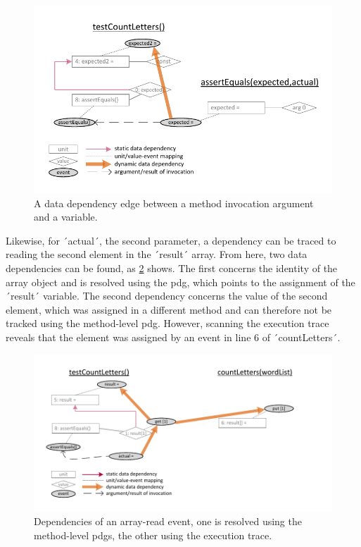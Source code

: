 \begin{figure}[tp]
\centering
\includegraphics[width=.8\linewidth, clip, trim=6mm 6mm 6mm 7mm]{img/graph_dynamic_arg}
\caption{A data dependency edge between a method invocation argument and a variable.}
\label{fig:graph_dynamic_arg}
\end{figure}

Likewise, for ´actual´, the second parameter, a dependency can be traced to reading the second element in the ´result´ array.
From here, two data dependencies can be found, as \cref{fig:graph_dynamic_array} shows.
The first concerns the identity of the array object and is resolved using the \ac{pdg}, which points to the assignment of the ´result´ variable.
The second dependency concerns the value of the second element, which was assigned in a different method and can therefore not be tracked using the method-level \ac{pdg}.
However, scanning the execution trace reveals that the element was assigned by an event in line 6 of ´countLetters´.

\begin{figure}[tp]
\centering
\includegraphics[width=.8\linewidth, clip, trim=6mm 7mm 19mm 7mm]{img/graph_dynamic_array}
\caption[Dependencies of an array-read event]{Dependencies of an array-read event, one is resolved using the method-level \aclp{pdg}, the other using the execution trace.}
\label{fig:graph_dynamic_array}
\end{figure}

